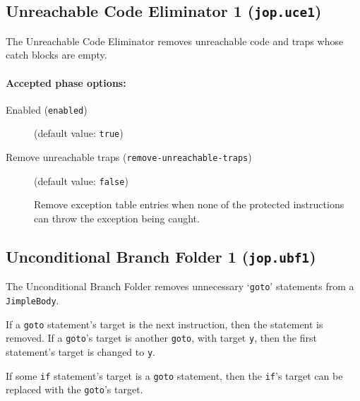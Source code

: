 \documentclass{article}
\begin{document}
\subsection{Unreachable Code Eliminator 1 ({\tt jop.uce1})}

The Unreachable Code Eliminator removes unreachable code and
traps whose catch blocks are empty.


\paragraph{Accepted phase options:} 

\begin{description}

\item[Enabled ({\tt enabled})]
(default value: {\tt true})






\item[Remove unreachable traps ({\tt remove-unreachable-traps})]
(default value: {\tt false})




Remove exception table entries when none of the protected instructions can
throw the exception being caught.



\end{description}

\subsection{Unconditional Branch Folder 1 ({\tt jop.ubf1})}


\par

The Unconditional Branch Folder removes unnecessary `{\tt goto}'
statements from a {\tt JimpleBody}.

\par

If a {\tt goto} statement's target is the next instruction,
then the statement is removed.  If a {\tt goto}'s target is
another {\tt goto}, with target {\tt y}, then the first
statement's target is changed to {\tt y}.

\par

If some {\tt if} statement's target is a {\tt goto}
statement, then the {\tt if}'s target can be replaced with the
{\tt goto}'s target.

\par
\end{document}
